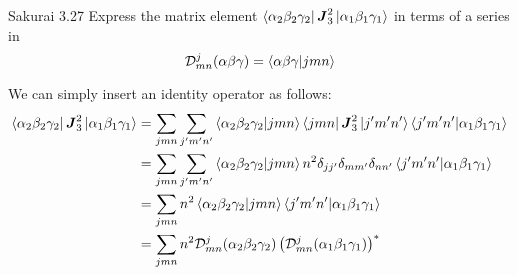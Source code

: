 \documentclass{article}
\newcommand{\bs}{\boldsymbol}
\begin{document}
\newpage
\begin{section}{Sakurai 3.27}
Express the matrix element $\bra{\alpha_2\beta_2\gamma_2} \bs{J}_3^2 \ket{\alpha_1\beta_1\gamma_1}$ in terms of a series in
$$
	\mathcal{D}_{mn}^j (\alpha\beta\gamma) = \bra{\alpha\beta\gamma} \ket{jmn}
$$

\begin{tcolorbox}
	We can simply insert an identity operator as follows:
	\begin{align*}
		\bra{\alpha_2\beta_2\gamma_2} \bs{J}_3^2 \ket{\alpha_1\beta_1\gamma_1}
		 & = \sum_{jmn} \sum_{j'm'n'} \bra{\alpha_2\beta_2\gamma_2} \ket{jmn}\bra{jmn} \bs{J}_3^2 \ket{j'm'n'}\bra{j'm'n'} \ket{\alpha_1\beta_1\gamma_1}         \\
		 & = \sum_{jmn} \sum_{j'm'n'} \bra{\alpha_2\beta_2\gamma_2} \ket{jmn} n^2 \delta_{jj'}\delta_{mm'}\delta_{nn'} \bra{j'm'n'}\ket{\alpha_1\beta_1\gamma_1} \\
		 & = \sum_{jmn} n^2 \bra{\alpha_2\beta_2\gamma_2} \ket{jmn}  \bra{j'm'n'}\ket{\alpha_1\beta_1\gamma_1}                                                   \\
		 & = \sum_{jmn} n^2 \mathcal{D}_{mn}^j (\alpha_2\beta_2\gamma_2) \left( \mathcal{D}_{mn}^j (\alpha_1\beta_1\gamma_1) \right)^*                           \\
	\end{align*}
\end{tcolorbox}
\end{section}
\end{document}
